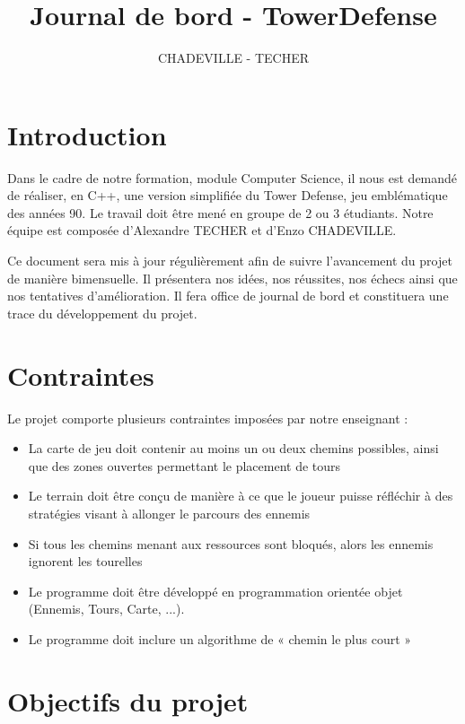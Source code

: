 \documentclass{article}
\title{Journal de bord - TowerDefense}
\author{CHADEVILLE - TECHER}
\begin{document}
\maketitle
\tableofcontents
\newpage


\section{Introduction}

Dans le cadre de notre formation, module Computer Science, il nous est demandé de réaliser, en C++, une version simplifiée du Tower Defense, jeu emblématique des années 90. Le travail doit être mené en groupe de 2 ou 3 étudiants. Notre équipe est composée d’Alexandre TECHER et d’Enzo CHADEVILLE.

Ce document sera mis à jour régulièrement afin de suivre l’avancement du projet de manière bimensuelle. Il présentera nos idées, nos réussites, nos échecs ainsi que nos tentatives d’amélioration. Il fera office de journal de bord et constituera une trace du développement du projet.  

\section{Contraintes}
Le projet comporte plusieurs contraintes imposées par notre enseignant :

\begin{itemize}
\item La carte de jeu doit contenir au moins un ou deux chemins possibles, ainsi que des zones ouvertes permettant le placement de tours
\item Le terrain doit être conçu de manière à ce que le joueur puisse réfléchir à des stratégies visant à allonger le parcours des ennemis
\item Si tous les chemins menant aux ressources sont bloqués, alors les ennemis ignorent les tourelles
\item Le programme doit être développé en programmation orientée objet (Ennemis, Tours, Carte, ...).
\item Le programme doit inclure un algorithme de « chemin le plus court »
\end{itemize}

\newpage

\section{Objectifs du projet}
\end{document}
